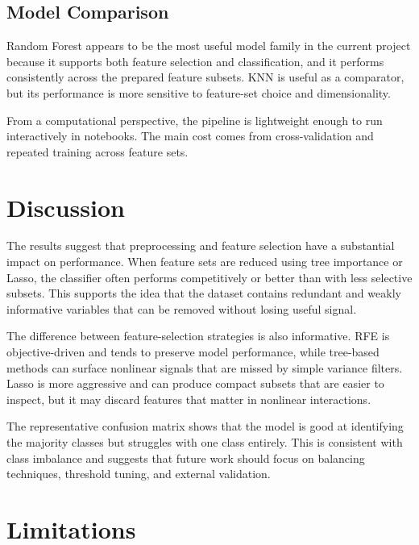 \documentclass[11pt,a4paper]{article}
\begin{document}
\subsection{Model Comparison}


Random Forest appears to be the most useful model family in the current project because it supports both feature selection and classification, and it performs consistently across the prepared feature subsets. KNN is useful as a comparator, but its performance is more sensitive to feature-set choice and dimensionality.

From a computational perspective, the pipeline is lightweight enough to run interactively in notebooks. The main cost comes from cross-validation and repeated training across feature sets.

\section{Discussion}


The results suggest that preprocessing and feature selection have a substantial impact on performance. When feature sets are reduced using tree importance or Lasso, the classifier often performs competitively or better than with less selective subsets. This supports the idea that the dataset contains redundant and weakly informative variables that can be removed without losing useful signal.

The difference between feature-selection strategies is also informative. RFE is objective-driven and tends to preserve model performance, while tree-based methods can surface nonlinear signals that are missed by simple variance filters. Lasso is more aggressive and can produce compact subsets that are easier to inspect, but it may discard features that matter in nonlinear interactions.

The representative confusion matrix shows that the model is good at identifying the majority classes but struggles with one class entirely. This is consistent with class imbalance and suggests that future work should focus on balancing techniques, threshold tuning, and external validation.

\section{Limitations}
\end{document}
